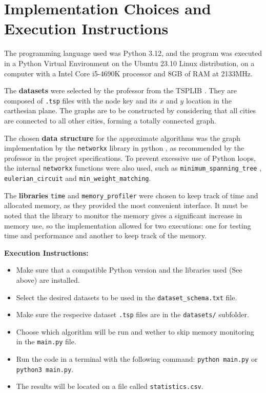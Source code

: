 \documentclass[12pt]{article}
\begin{document}
\section{Implementation Choices and Execution Instructions} \label{sec:implementation}

The programming language used was Python 3.12, and the program was executed 
in a Python Virtual Environment on the Ubuntu 23.10 Linux distribution, on a computer with a 
Intel Core i5-4690K processor and 8GB of RAM at 2133MHz.

The \textbf{datasets} were selected by the professor from the TSPLIB \cite{dataset_lib}. They are 
composed of \texttt{.tsp} files with the node key and its $x$ and $y$ location in the carthesian plane. 
The graphs are to be constructed by considering that all cities are connected to all other cities, forming 
a totally connected graph.

The chosen \textbf{data structure} for the approximate algorithms was the graph implementation 
by the \texttt{networkx} library in python \cite{networkx_docs}, as recommended by 
the professor in the project specifications. To prevent excessive use of Python loops, 
the internal \texttt{networkx} functions were also used, such as \texttt{minimum\_spanning\_tree} , 
\texttt{eulerian\_circuit} and \texttt{min\_weight\_matching}.

The \textbf{libraries} \texttt{time} and \texttt{memory\_profiler} were chosen to keep track of time 
and allocated memory, as they provided the most convenient interface. It must be noted that the library 
to monitor the memory gives a significant increase in memory use, so the implementation allowed for 
two executions: one for testing time and performance and another to keep track of the memory.

\textbf{Execution Instructions:}
\begin{itemize}
  \item Make sure that a compatible Python version and the libraries used (See above) are installed.
  \item Select the desired datasets to be used in the \texttt{dataset\_schema.txt} file.
  \item Make sure the respecive dataset \texttt{.tsp} files are in the \texttt{datasets/} subfolder.
  \item Choose which algorithm will be run and wether to skip memory monitoring in the \texttt{main.py} file.
  \item Run the code in a terminal with the following command: \texttt{python main.py} or \texttt{python3 main.py}.
  \item The results will be located on a file called \texttt{statistics.csv}.
\end{itemize}
\end{document}
